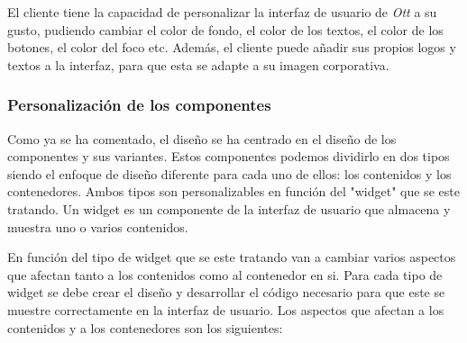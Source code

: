El cliente tiene la capacidad de personalizar la interfaz de usuario de \textit{Ott} a su gusto, pudiendo cambiar
el color de fondo, el color de los textos, el color de los botones, el color del foco etc. Además, el cliente puede añadir sus propios
logos y textos a la interfaz, para que esta se adapte a su imagen corporativa. 

\subsubsection{Personalización de los componentes}
\label{sec:diseno-ux-personalizacion}

Como ya se ha comentado, el diseño se ha centrado en el diseño de los componentes y sus variantes. Estos componentes podemos dividirlo en dos tipos
siendo el enfoque de diseño diferente para cada uno de ellos: los contenidos y los contenedores. Ambos tipos son personalizables en función del 
"widget" que se este tratando. Un widget es un componente de la interfaz de usuario que almacena y muestra uno o varios contenidos.

En función del tipo de widget que se este tratando van a cambiar varios aspectos que afectan tanto a los contenidos como al contenedor en si. Para cada
tipo de widget se debe crear el diseño y desarrollar el código necesario para que este se muestre correctamente en la interfaz de usuario. Los aspectos
que afectan a los contenidos y a los contenedores son los siguientes:

